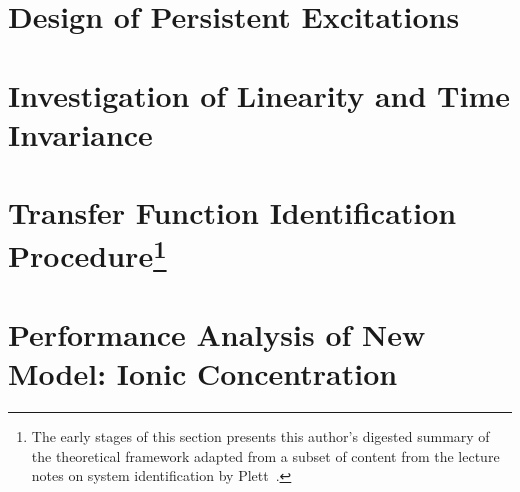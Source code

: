\section{Design of Persistent Excitations}\label{sec:persistentexcitation}


\section{Investigation of Linearity and Time Invariance}\label{sec:lticheck}


\section[Transfer Function Identification Procedure]{Transfer Function Identification Procedure\footnote{The early stages of this section presents this author's digested summary of the theoretical framework adapted from a subset of content from the lecture notes on system identification by Plett~\cite{PlettECE5560_02,PlettECE5560_03,PlettECE5560_04}.}}\label{sec:actualsysid}


\section{Performance Analysis of New Model: Ionic Concentration}







